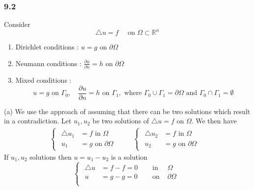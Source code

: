 \subsubsection{9.2}
Consider 
\begin{equation}
    \triangle u = f \quad \text{ on } \Omega \subset \mathbb{R}^n
    \label{eq:9.2}
\end{equation}
\begin{enumerate}[label={(\alph*)}]
    \item Dirichlet conditions : $ u = g  $ on $ \partial \Omega  $
    \item Neumann conditions : $ \frac{ \partial u }{ \partial n  } = h $ on $ \partial
        \Omega $
    \item Mixed conditions : 
        \[
        u = g \text{ on } \Gamma_0, \quad \frac{ \partial u }{ \partial n  } = h \text{ on
        } \Gamma_1, \text{ where } \Gamma_0 \cup \Gamma_1 = \partial \Omega \text{ and }
        \Gamma_0 \cap \Gamma_1 = \emptyset 
        \]
\end{enumerate}
(a) 
We use the approach of assuming that there can be two solutions which result in a
contradiction. Let $ u_1,u_2 $ be two solutions of $ \triangle u = f \text{ on } \Omega $.
We then have 
\[
    \begin{aligned} 
&\begin{cases} 
    \begin{aligned}
        \triangle u_1 &= f \text{ in } \Omega \qquad \\
        u_1 &= g \text{ on } \partial \Omega 
    \end{aligned}
\end{cases}
&\begin{cases} 
    \begin{aligned}
        \triangle u_2 &= f \text{ in } \Omega \qquad \\
        u_2 &= g \text{ on } \partial \Omega 
    \end{aligned}
\end{cases}
\end{aligned} 
\]
If $ u_1,u_2 $ solutions then $ u = u_1 - u_2  $ is a solution 
\[
\begin{cases}
    \begin{aligned}
        \triangle u &= f - f = 0 \quad &\text{ in } &\Omega   \\ 
        u &= g - g = 0 \quad &\text{ on } &\partial   \Omega   \\ 
    \end{aligned} 
\end{cases}
\]

